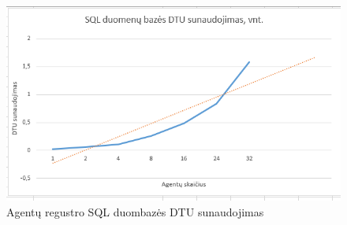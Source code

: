 \begin{figure}[htp!]
\hspace{-1cm}
\centering
\includegraphics[scale=1]{img/sql_duomenu_bazes_DTU_sanaudos.png}
\caption{Agentų regustro SQL duombazės DTU sunaudojimas}
\label{fig:dtu_usage}
\end{figure}